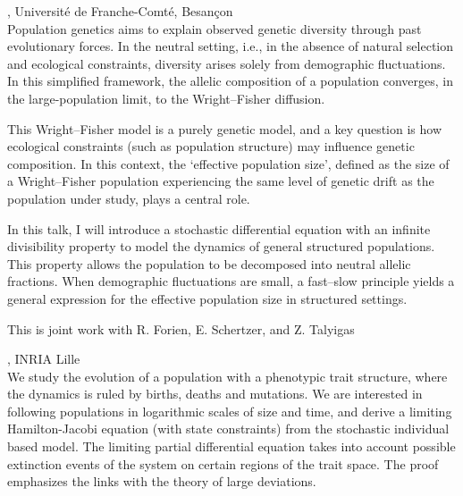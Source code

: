 \documentclass[12pt,a4paper]{article}
\begin{document}
\bigskip\bigskip

, Université de Franche-Comté, Besançon \\[2ex] Population genetics aims to explain observed genetic diversity through past evolutionary forces. In the neutral setting, i.e., in the absence of natural selection and ecological constraints, diversity arises solely from demographic fluctuations. In this simplified framework, the allelic composition of a population converges, in the large-population limit, to the Wright–Fisher diffusion. 

 This Wright–Fisher model is a purely genetic model, and a key question is how ecological constraints (such as population structure) may influence genetic composition. In this context, the ‘effective population size’, defined as the size of a Wright–Fisher population experiencing the same level of genetic drift as the population under study, plays a central role. 

 In this talk, I will introduce a stochastic differential equation with an infinite divisibility property to model the dynamics of general structured populations. This property allows the population to be decomposed into neutral allelic fractions. When demographic fluctuations are small, a fast–slow principle yields a general expression for the effective population size in structured settings. 

 This is joint work with R. Forien, E. Schertzer, and Z. Talyigas 

\bigskip\bigskip

, INRIA Lille \\[2ex] We study the evolution of a population with a phenotypic trait structure, where the dynamics is ruled by births, deaths and mutations. We are interested in following populations in logarithmic scales of size and time, and derive a limiting Hamilton-Jacobi equation (with state constraints) from the stochastic individual based model. The limiting partial differential equation takes into account possible extinction events of the system on certain regions of the trait space. The proof emphasizes the links with the theory of large deviations. 
\end{document}
